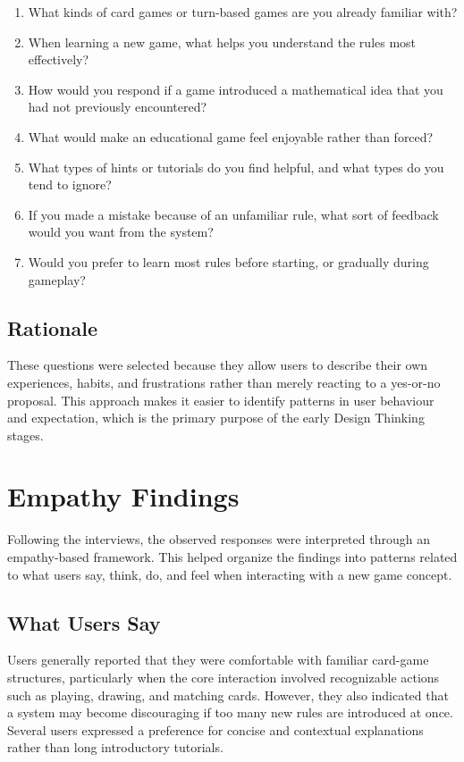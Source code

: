 \documentclass[12pt]{article}
\begin{document}
    \begin{enumerate}[leftmargin=2em]
        \item What kinds of card games or turn-based games are you already familiar with?
        \item When learning a new game, what helps you understand the rules most effectively?
        \item How would you respond if a game introduced a mathematical idea that you had not previously encountered?
        \item What would make an educational game feel enjoyable rather than forced?
        \item What types of hints or tutorials do you find helpful, and what types do you tend to ignore?
        \item If you made a mistake because of an unfamiliar rule, what sort of feedback would you want from the system?
        \item Would you prefer to learn most rules before starting, or gradually during gameplay?
    \end{enumerate}

    \subsection{Rationale}

    These questions were selected because they allow users to describe their own experiences, habits, and frustrations rather than merely reacting to a yes-or-no proposal. This approach makes it easier to identify patterns in user behaviour and expectation, which is the primary purpose of the early Design Thinking stages.

    \section{Empathy Findings}

    Following the interviews, the observed responses were interpreted through an empathy-based framework. This helped organize the findings into patterns related to what users say, think, do, and feel when interacting with a new game concept.

    \subsection{What Users Say}

    Users generally reported that they were comfortable with familiar card-game structures, particularly when the core interaction involved recognizable actions such as playing, drawing, and matching cards. However, they also indicated that a system may become discouraging if too many new rules are introduced at once. Several users expressed a preference for concise and contextual explanations rather than long introductory tutorials.
\end{document}
